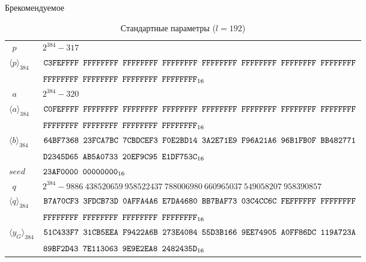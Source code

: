 \begin{appendix}{Б}{рекомендуемое}
\begin{table}[!h]
\caption{Стандартные параметры ($l=192$)}\label{Table.STD.StdCurve192}
{\small
\begin{tabular}{|l|l|}
\hline
$\phantom{\langle}p\phantom{\rangle}$ &
$2^{384}-317$\\
$\langle p\rangle_{384}$ & 
$\texttt{C3FEFFFF~FFFFFFFF~FFFFFFFF~FFFFFFFF~FFFFFFFF~FFFFFFFF~FFFFFFFF~FFFFFFFF}$\\
& 
$\texttt{FFFFFFFF~FFFFFFFF~FFFFFFFF~FFFFFFFF}_{16}$\\
%
\hline
$\phantom{\langle}a\phantom{\rangle}$ &
$2^{384}-320$\\
$\langle a\rangle_{384}$ & 
$\texttt{C0FEFFFF~FFFFFFFF~FFFFFFFF~FFFFFFFF~FFFFFFFF~FFFFFFFF~FFFFFFFF~FFFFFFFF}$\\
& 
$\texttt{FFFFFFFF~FFFFFFFF~FFFFFFFF~FFFFFFFF}_{16}$\\
%
\hline
$\langle b\rangle_{384}$ & 
$\texttt{64BF7368~23FCA7BC~7CBDCEF3~F0E2BD14~3A2E71E9~F96A21A6~96B1FB0F~BB482771}$\\
&
$\texttt{D2345D65~AB5A0733~20EF9C95~E1DF753C}_{16}$\\
%
\hline
$seed$ & 
$\texttt{23AF0000~00000000}_{16}$\\
%
\hline
$\phantom{\langle}q\phantom{\rangle}$ &
$2^{384}-9886~438520659~958522437~788006980~660965037~549058207~958390857$\\
$\langle q\rangle_{384}$ & 
$\texttt{B7A70CF3~3FDCB73D~0AFFA4A6~E7DA4680~BB7BAF73~03C4CC6C~FEFFFFFF~FFFFFFFF}$\\
&
$\texttt{FFFFFFFF~FFFFFFFF~FFFFFFFF~FFFFFFFF}_{16}$\\
%
\hline
$\langle y_G\rangle_{384}$ & 
$\texttt{51C433F7~31CB5EEA~F9422A6B~273E4084~55D3B166~9EE74905~A0FF86DC~119A723A}$\\
&
$\texttt{89BF2D43~7E113063~9E9E2EA8~2482435D}_{16}$\\
\hline
\end{tabular}
}
\end{table}

%
%
    

\end{appendix}
